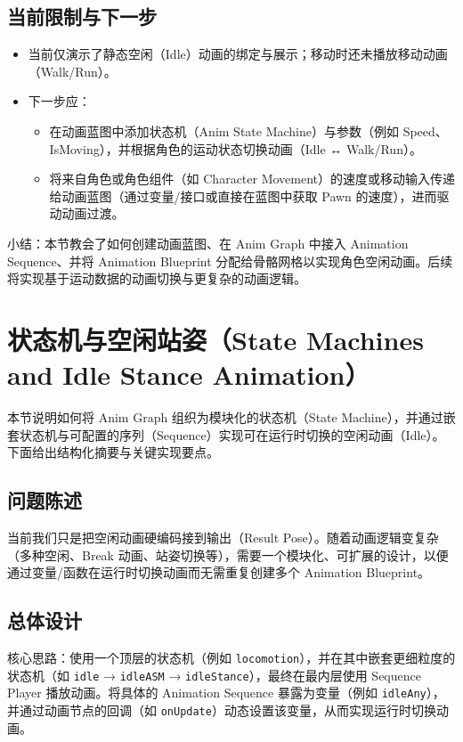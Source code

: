 \documentclass[10pt,CJKmath]{zhbook-v1}
\newcommand{\il}[1]{\texttt{#1}}%
\begin{document}
\subsection{当前限制与下一步}
\begin{itemize}
  \item 当前仅演示了静态空闲（Idle）动画的绑定与展示；移动时还未播放移动动画（Walk/Run）。
  \item 下一步应：
    \begin{itemize}
      \item 在动画蓝图中添加状态机（Anim State Machine）与参数（例如 Speed、IsMoving），并根据角色的运动状态切换动画（Idle ↔ Walk/Run）。
      \item 将来自角色或角色组件（如 Character Movement）的速度或移动输入传递给动画蓝图（通过变量/接口或直接在蓝图中获取 Pawn 的速度），进而驱动动画过渡。
    \end{itemize}
\end{itemize}

\bigskip
\noindent 小结：本节教会了如何创建动画蓝图、在 Anim Graph 中接入 Animation Sequence、并将 Animation Blueprint 分配给骨骼网格以实现角色空闲动画。后续将实现基于运动数据的动画切换与更复杂的动画逻辑。





\section{状态机与空闲站姿（State Machines and Idle Stance Animation）}

本节说明如何将 Anim Graph 组织为模块化的状态机（State Machine），并通过嵌套状态机与可配置的序列（Sequence）实现可在运行时切换的空闲动画（Idle）。下面给出结构化摘要与关键实现要点。

\subsection{问题陈述}
当前我们只是把空闲动画硬编码接到输出（Result Pose）。随着动画逻辑变复杂（多种空闲、Break 动画、站姿切换等），需要一个模块化、可扩展的设计，以便通过变量/函数在运行时切换动画而无需重复创建多个 Animation Blueprint。

\subsection{总体设计}
核心思路：使用一个顶层的状态机（例如 \il{locomotion}），并在其中嵌套更细粒度的状态机（如 \il{idle} → \il{idleASM} → \il{idleStance}），最终在最内层使用 Sequence Player 播放动画。将具体的 Animation Sequence 暴露为变量（例如 \il{idleAny}），并通过动画节点的回调（如 \il{onUpdate}）动态设置该变量，从而实现运行时切换动画。
\end{document}
